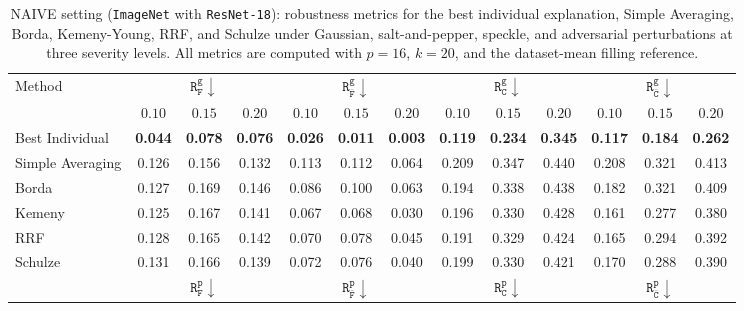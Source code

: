 \begin{table}[!ht]
\tiny
\setlength{\tabcolsep}{0.1cm}
\renewcommand{\arraystretch}{1.4}
\centering
\caption{NAIVE setting (\texttt{ImageNet} with \texttt{ResNet-18}): robustness metrics for the best individual explanation, Simple Averaging, Borda, Kemeny-Young, RRF, and Schulze under Gaussian, salt-and-pepper, speckle, and adversarial perturbations at three severity levels.
All metrics are computed with $p=16$, $k=20$, and the dataset-mean filling reference.}
\label{tab:naive_single_case:ablation4}
\begin{tabular}{|l||c|c|c||c|c|c||c|c|c||c|c|c|}
\hline
\hline
\multirow{2}{*}{Method} & \multicolumn{3}{c||}{$\mathtt{R}_{\mathtt{F}}^{\mathtt{g}}\downarrow$} & \multicolumn{3}{c||}{$\mathtt{R}_{\bar{\mathtt{F}}}^{\mathtt{g}}\downarrow$} & \multicolumn{3}{c||}{$\mathtt{R}_{\mathtt{C}}^{\mathtt{g}}\downarrow$} & \multicolumn{3}{c|}{$\mathtt{R}_{\bar{\mathtt{C}}}^{\mathtt{g}}\downarrow$} \\
\cline{2-13}
\multicolumn{1}{|r||}{$\sigma_g$} & $0.10$ & $0.15$ & $0.20$ & $0.10$ & $0.15$ & $0.20$ & $0.10$ & $0.15$ & $0.20$ & $0.10$ & $0.15$ & $0.20$ \\
\hline
\hline
Best Individual & \textbf{0.044} & \textbf{0.078} & \textbf{0.076} & \textbf{0.026} & \textbf{0.011} & \textbf{0.003} & \textbf{0.119} & \textbf{0.234} & \textbf{0.345} & \textbf{0.117} & \textbf{0.184} & \textbf{0.262} \\
\hline
Simple Averaging & 0.126 & 0.156 & 0.132 & 0.113 & 0.112 & 0.064 & 0.209 & 0.347 & 0.440 & 0.208 & 0.321 & 0.413 \\
\hline
Borda & 0.127 & 0.169 & 0.146 & 0.086 & 0.100 & 0.063 & 0.194 & 0.338 & 0.438 & 0.182 & 0.321 & 0.409 \\
Kemeny & 0.125 & 0.167 & 0.141 & 0.067 & 0.068 & 0.030 & 0.196 & 0.330 & 0.428 & 0.161 & 0.277 & 0.380 \\
RRF & 0.128 & 0.165 & 0.142 & 0.070 & 0.078 & 0.045 & 0.191 & 0.329 & 0.424 & 0.165 & 0.294 & 0.392 \\
Schulze & 0.131 & 0.166 & 0.139 & 0.072 & 0.076 & 0.040 & 0.199 & 0.330 & 0.421 & 0.170 & 0.288 & 0.390 \\
\hline
\hline
& \multicolumn{3}{c||}{$\mathtt{R}_{\mathtt{F}}^{\mathtt{p}}\downarrow$} & \multicolumn{3}{c||}{$\mathtt{R}_{\bar{\mathtt{F}}}^{\mathtt{p}}\downarrow$} & \multicolumn{3}{c||}{$\mathtt{R}_{\mathtt{C}}^{\mathtt{p}}\downarrow$} & \multicolumn{3}{c|}{$\mathtt{R}_{\bar{\mathtt{C}}}^{\mathtt{p}}\downarrow$} \\

\end{tabular}
\end{table}
